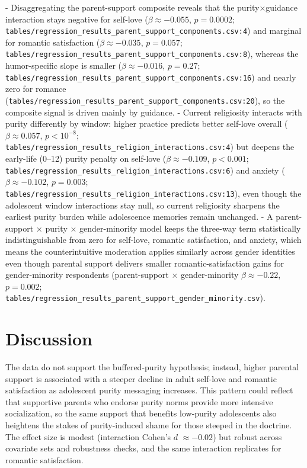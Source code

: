 \documentclass[12pt]{article}
\begin{document}
- Disaggregating the parent-support composite reveals that the purity×guidance interaction stays negative for self-love ($\beta \approx -0.055$, $p=0.0002$; \texttt{tables/regression\_results\_parent\_support\_components.csv:4}) and marginal for romantic satisfaction ($\beta \approx -0.035$, $p=0.057$; \texttt{tables/regression\_results\_parent\_support\_components.csv:8}), whereas the humor-specific slope is smaller ($\beta \approx -0.016$, $p=0.27$; \texttt{tables/regression\_results\_parent\_support\_components.csv:16}) and nearly zero for romance (\texttt{tables/regression\_results\_parent\_support\_components.csv:20}), so the composite signal is driven mainly by guidance.
- Current religiosity interacts with purity differently by window: higher practice predicts better self-love overall ($\beta \approx 0.057$, $p<10^{-8}$; \texttt{tables/regression\_results\_religion\_interactions.csv:4}) but deepens the early-life (0--12) purity penalty on self-love ($\beta \approx -0.109$, $p<0.001$; \texttt{tables/regression\_results\_religion\_interactions.csv:6}) and anxiety ($\beta \approx -0.102$, $p=0.003$; \texttt{tables/regression\_results\_religion\_interactions.csv:13}), even though the adolescent window interactions stay null, so current religiosity sharpens the earliest purity burden while adolescence memories remain unchanged.
- A parent-support × purity × gender-minority model keeps the three-way term statistically indistinguishable from zero for self-love, romantic satisfaction, and anxiety, which means the counterintuitive moderation applies similarly across gender identities even though parental support delivers smaller romantic-satisfaction gains for gender-minority respondents (parent-support × gender-minority $\beta \approx -0.22$, $p=0.002$; \texttt{tables/regression\_results\_parent\_support\_gender\_minority.csv}).

\section{Discussion}
The data do not support the buffered-purity hypothesis; instead, higher parental support is associated with a steeper decline in adult self-love and romantic satisfaction as adolescent purity messaging increases. This pattern could reflect that supportive parents who endorse purity norms provide more intensive socialization, so the same support that benefits low-purity adolescents also heightens the stakes of purity-induced shame for those steeped in the doctrine. The effect size is modest (interaction Cohen's $d$ $\approx -0.02$) but robust across covariate sets and robustness checks, and the same interaction replicates for romantic satisfaction.
\end{document}
